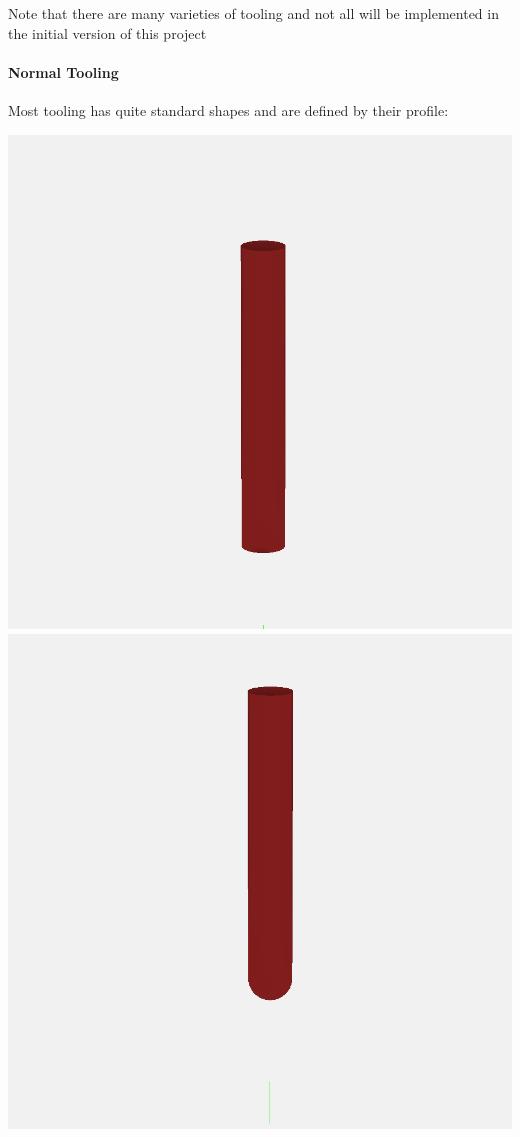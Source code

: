 \documentclass{ltxdoc}
\begin{document}
Note that there are many varieties of tooling and not all will be implemented in the initial 
version of this project
 
\begin{samepage}
\paragraph{Normal Tooling}

\label{para:normaltooling} Most tooling has quite standard shapes 
and are defined by their profile:

  \noindent\includegraphics[width=\linewidth/3]{images/tool_square_201.png}%
           \includegraphics[width=\linewidth/3]{images/tool_ball_202.png}%

\end{samepage}
\end{document}
